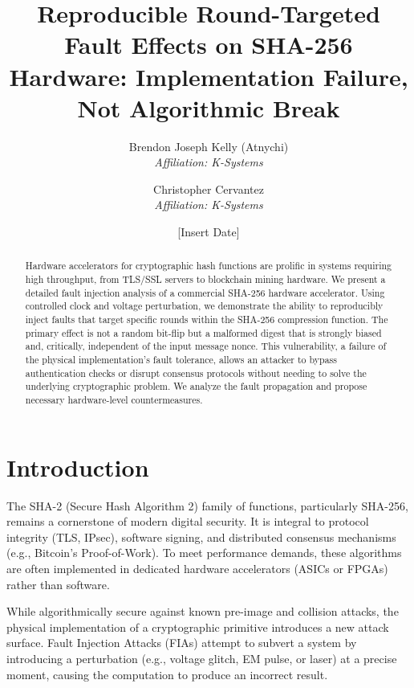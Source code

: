 \documentclass[11pt, a4paper]{article}
\title{Reproducible Round-Targeted Fault Effects on SHA-256 Hardware: Implementation Failure, Not Algorithmic Break}
\author{Brendon Joseph Kelly (Atnychi) \\ \textit{Affiliation: K-Systems} \and Christopher Cervantez \\ \textit{Affiliation: K-Systems}}
\date{[Insert Date]}
\begin{document}
\maketitle
\pagestyle{headings} %

\begin{abstract}
Hardware accelerators for cryptographic hash functions are prolific in systems requiring high throughput, from TLS/SSL servers to blockchain mining hardware. We present a detailed fault injection analysis of a commercial SHA-256 hardware accelerator. Using controlled clock and voltage perturbation, we demonstrate the ability to reproducibly inject faults that target specific rounds within the SHA-256 compression function. The primary effect is not a random bit-flip but a malformed digest that is strongly biased and, critically, independent of the input message nonce. This vulnerability, a failure of the physical implementation's fault tolerance, allows an attacker to bypass authentication checks or disrupt consensus protocols without needing to solve the underlying cryptographic problem. We analyze the fault propagation and propose necessary hardware-level countermeasures.
\end{abstract}

\section{Introduction}
The SHA-2 (Secure Hash Algorithm 2) family of functions, particularly SHA-256, remains a cornerstone of modern digital security. It is integral to protocol integrity (TLS, IPsec), software signing, and distributed consensus mechanisms (e.g., Bitcoin's Proof-of-Work). To meet performance demands, these algorithms are often implemented in dedicated hardware accelerators (ASICs or FPGAs) rather than software.

While algorithmically secure against known pre-image and collision attacks, the physical implementation of a cryptographic primitive introduces a new attack surface. Fault Injection Attacks (FIAs) attempt to subvert a system by introducing a perturbation (e.g., voltage glitch, EM pulse, or laser) at a precise moment, causing the computation to produce an incorrect result.
\end{document}
